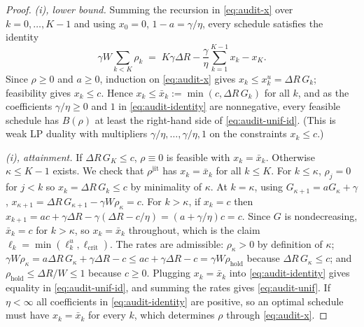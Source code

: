 \documentclass[11pt,a4paper]{article}
\begin{document}
\begin{proof}
\emph{(i), lower bound.} Summing the recursion in \eqref{eq:audit-x} over
$k=0,\dots,K-1$ and using $x_0=0$, $1-a=\gamma/\eta$, every schedule satisfies
the identity
\begin{equation}\label{eq:audit-identity}
  \gamma W\sum_{k<K}\rho_k \;=\; K\gamma\Delta R-\frac{\gamma}{\eta}\sum_{k=1}^{K-1}x_k-x_K .
\end{equation}
Since $\rho\ge0$ and $a\ge0$, induction on \eqref{eq:audit-x} gives
$x_k\le x^u_k=\Delta R\,G_k$; feasibility gives $x_k\le c$. Hence
$x_k\le\bar x_k:=\min(c,\Delta R\,G_k)$ for all $k$, and as the coefficients
$\gamma/\eta\ge0$ and $1$ in \eqref{eq:audit-identity} are nonnegative, every
feasible schedule has $B(\rho)$ at least the right-hand side of
\eqref{eq:audit-unif-id}. (This is weak LP duality with multipliers
$\gamma/\eta,\dots,\gamma/\eta,1$ on the constraints $x_k\le c$.)

\emph{(i), attainment.} If $\Delta R\,G_K\le c$, $\rho\equiv0$ is feasible with
$x_k=\bar x_k$. Otherwise $\kappa\le K-1$ exists. We check that
$\rho^{\mathrm{jit}}$ has $x_k=\bar x_k$ for all $k\le K$. For $k\le\kappa$,
$\rho_j=0$ for $j<k$ so $x_k=\Delta R\,G_k\le c$ by minimality of $\kappa$.
At $k=\kappa$, using $G_{\kappa+1}=aG_\kappa+\gamma$,
$x_{\kappa+1}=\Delta R\,G_{\kappa+1}-\gamma W\rho_\kappa=c$. For $k>\kappa$, if
$x_k=c$ then $x_{k+1}=ac+\gamma\Delta R-\gamma(\Delta R-c/\eta)=(a+\gamma/\eta)c=c$.
Since $G$ is nondecreasing, $\bar x_k=c$ for $k>\kappa$, so $x_k=\bar x_k$
throughout, which is the claim $\ell_k=\min(\ell^u_k,\ell_{\mathrm{crit}})$.
The rates are admissible: $\rho_\kappa>0$ by definition of $\kappa$;
$\gamma W\rho_\kappa=a\Delta R\,G_\kappa+\gamma\Delta R-c\le ac+\gamma\Delta R-c
=\gamma W\rho_{\mathrm{hold}}$ because $\Delta R\,G_\kappa\le c$; and
$\rho_{\mathrm{hold}}\le\Delta R/W\le1$ because $c\ge0$. Plugging
$x_k=\bar x_k$ into \eqref{eq:audit-identity} gives equality in
\eqref{eq:audit-unif-id}, and summing the rates gives \eqref{eq:audit-unif}.
If $\eta<\infty$ all coefficients in \eqref{eq:audit-identity} are positive, so
an optimal schedule must have $x_k=\bar x_k$ for every $k$, which determines
$\rho$ through \eqref{eq:audit-x}.


\end{proof}
\end{document}
